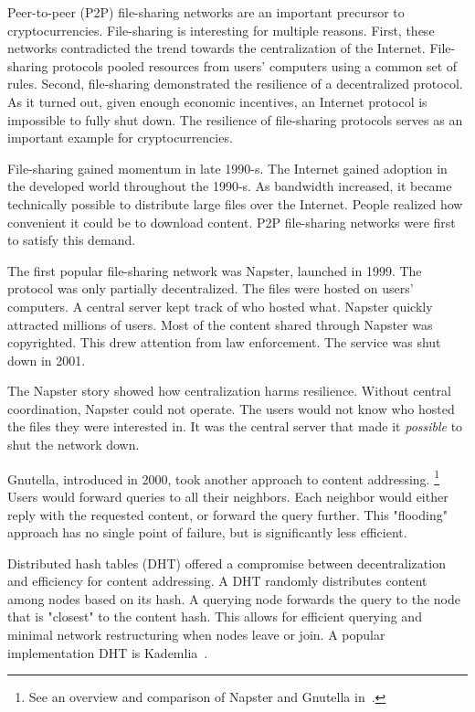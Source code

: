 Peer-to-peer (P2P) file-sharing networks are an important precursor to cryptocurrencies.
File-sharing is interesting for multiple reasons.
First, these networks contradicted the trend towards the centralization of the Internet.
File-sharing protocols pooled resources from users' computers using a common set of rules.
Second, file-sharing demonstrated the resilience of a decentralized protocol.
As it turned out, given enough economic incentives, an Internet protocol is impossible to fully shut down.
The resilience of file-sharing protocols serves as an important example for cryptocurrencies.

File-sharing gained momentum in late 1990-s.
The Internet gained adoption in the developed world throughout the 1990-s.
As bandwidth increased, it became technically possible to distribute large files over the Internet.
People realized how convenient it could be to download content.
P2P file-sharing networks were first to satisfy this demand.

The first popular file-sharing network was Napster, launched in 1999.
The protocol was only partially decentralized.
The files were hosted on users' computers.
A central server kept track of who hosted what.
Napster quickly attracted millions of users.
Most of the content shared through Napster was copyrighted.
This drew attention from law enforcement.
The service was shut down in 2001.

The Napster story showed how centralization harms resilience.
Without central coordination, Napster could not operate.
The users would not know who hosted the files they were interested in.
It was the central server that made it \textit{possible} to shut the network down.

Gnutella, introduced in 2000, took another approach to content addressing.
\footnote{See an overview and comparison of Napster and Gnutella in~\cite{Saroiu2003}.}
Users would forward queries to all their neighbors.
Each neighbor would either reply with the requested content, or forward the query further.
This "flooding" approach has no single point of failure, but is significantly less efficient.

Distributed hash tables (DHT) offered a compromise between decentralization and efficiency for content addressing.
A DHT randomly distributes content among nodes based on its hash.
A querying node forwards the query to the node that is "closest" to the content hash.
This allows for efficient querying and minimal network restructuring when nodes leave or join.
A popular implementation DHT is Kademlia~\cite{Maymounkov2002}.

